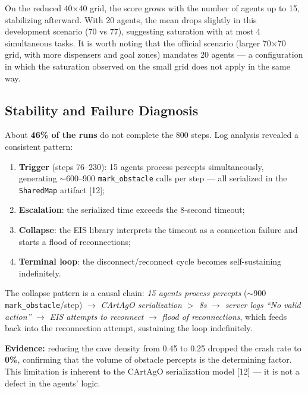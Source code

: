 \documentclass[11pt,a4paper]{article}
\newcommand{\code}[1]{\texttt{#1}}
\begin{document}
On the reduced 40$\times$40 grid, the score grows with the number of agents up to 15, stabilizing afterward. With 20 agents, the mean drops slightly in this development scenario (70 vs 77), suggesting saturation with at most 4 simultaneous tasks. It is worth noting that the official scenario (larger 70$\times$70 grid, with more dispensers and goal zones) mandates 20 agents --- a configuration in which the saturation observed on the small grid does not apply in the same way.

\subsection{Stability and Failure Diagnosis}
About \textbf{46\% of the runs} do not complete the 800 steps. Log analysis revealed a consistent pattern:
\begin{enumerate}
  \item \textbf{Trigger} (steps 76--230): 15 agents process percepts simultaneously, generating $\sim$600--900 \code{mark\_obstacle} calls per step --- all serialized in the \code{SharedMap} artifact [12];
  \item \textbf{Escalation}: the serialized time exceeds the 8-second timeout;
  \item \textbf{Collapse}: the EIS library interprets the timeout as a connection failure and starts a flood of reconnections;
  \item \textbf{Terminal loop}: the disconnect/reconnect cycle becomes self-sustaining indefinitely.
\end{enumerate}

The collapse pattern is a causal chain: \emph{15 agents process percepts} ($\sim$900 \code{mark\_obstacle}/step) $\rightarrow$ \emph{CArtAgO serialization $>$ 8s} $\rightarrow$ \emph{server logs ``No valid action''} $\rightarrow$ \emph{EIS attempts to reconnect} $\rightarrow$ \emph{flood of reconnections}, which feeds back into the reconnection attempt, sustaining the loop indefinitely.

\noindent\textbf{Evidence:} reducing the cave density from 0.45 to 0.25 dropped the crash rate to \textbf{0\%}, confirming that the volume of obstacle percepts is the determining factor. This limitation is inherent to the CArtAgO serialization model [12] --- it is not a defect in the agents' logic.
\end{document}
